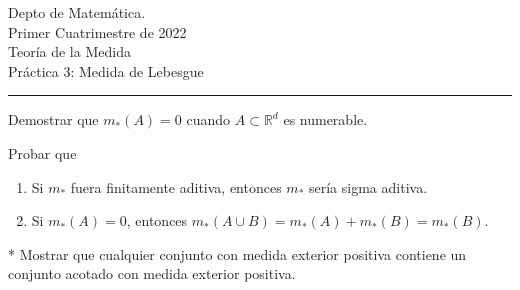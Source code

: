 \documentclass{book}
\begin{document}


\begin{large}
\begin{bfseries} %
        \noindent Depto de Matem\'atica.\\
        Primer Cuatrimestre de 2022\\                                                                                                                                                                                                                                                                                                                                                
        Teoría de la Medida \\
        Práctica 3: Medida de Lebesgue

\end{bfseries}
\end{large}
\par\noindent\rule{\textwidth}{.5pt}












\begin{ejer}{}  Demostrar que  $m_*(A)=0$  cuando $A\subset\mathbb{R}^d$ es numerable.
\end{ejer}  

\begin{ejer}{} Probar que
\begin{enumerate}
\item Si $m_*$ fuera finitamente aditiva, entonces $m_*$ sería  sigma aditiva.
\item Si $m_*(A)=0$, entonces $m_*(A\cup B)=m_*(A)+m_*(B)=m_*(B)$.
\end{enumerate}
\end{ejer} 









 




 \begin{ejer}{}* 
	Mostrar que cualquier conjunto con medida exterior positiva contiene un conjunto acotado con medida exterior positiva. 
	\end{ejer}
 
\end{document}
